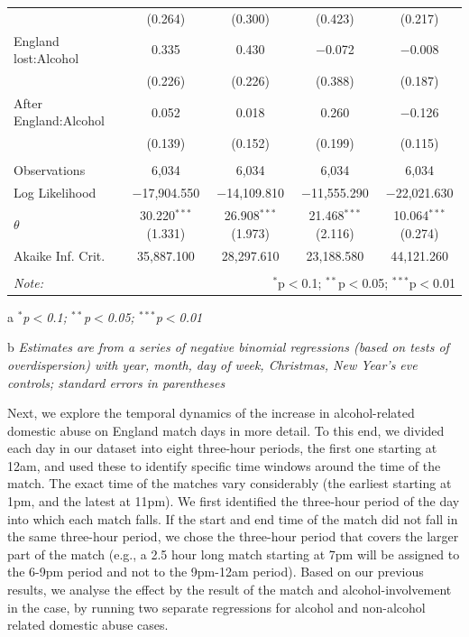 \documentclass[12pt, letterpaper]{article}
\begin{document}
\begin{table}[!htbp]
{\begin{threeparttable}
\begin{tabular}{@{\extracolsep{5pt}}lcccc}
  & (0.264) & (0.300) & (0.423) & (0.217) \\ 
  England lost:Alcohol & 0.335 & 0.430 & $-$0.072 & $-$0.008 \\ 
  & (0.226) & (0.226) & (0.388) & (0.187) \\ 
  After England:Alcohol & 0.052 & 0.018 & 0.260 & $-$0.126 \\ 
  & (0.139) & (0.152) & (0.199) & (0.115) \\ 
 \hline \\[-1.8ex] 
Observations & 6,034 & 6,034 & 6,034 & 6,034 \\ 
Log Likelihood & $-$17,904.550 & $-$14,109.810 & $-$11,555.290 & $-$22,021.630 \\ 
$\theta$ & 30.220$^{***}$  (1.331) & 26.908$^{***}$  (1.973) & 21.468$^{***}$  (2.116) & 10.064$^{***}$  (0.274) \\ 
Akaike Inf. Crit. & 35,887.100 & 28,297.610 & 23,188.580 & 44,121.260 \\ 
\hline 
\hline \\[-1.8ex] 
\textit{Note:}  & \multicolumn{4}{r}{$^{*}$p$<$0.1; $^{**}$p$<$0.05; $^{***}$p$<$0.01} \\ 
\end{tabular} 
\begin{tablenotes}
      \item[a] \textit{$^{*}$p$<$0.1; $^{**}$p$<$0.05; $^{***}$p$<$0.01}
      \item[b] \textit{Estimates are from a series of negative binomial regressions (based on tests of overdispersion)  with year, month, day of week, Christmas, New Year's eve controls; standard errors in parentheses}
    \end{tablenotes}
\end{threeparttable} }
\end{table}
Next, we explore the temporal dynamics of the increase in alcohol-related domestic abuse on England match days in more detail. To this end, we divided each day in our dataset into eight three-hour periods, the first one starting at 12am, and used these to identify specific time windows around the time of the match. The exact time of the matches vary considerably (the earliest starting at 1pm, and the latest at 11pm). We first identified the three-hour period of the day into which each match falls. If the start and end time of the match did not fall in the same three-hour period, we chose the three-hour period that covers the larger part of the match (e.g., a 2.5 hour long match starting at 7pm will be assigned to the 6-9pm period and not to the 9pm-12am period). Based on our previous results, we analyse the effect by the result of the match and alcohol-involvement in the case, by running two separate regressions for alcohol and non-alcohol related domestic abuse cases.
\end{document}
